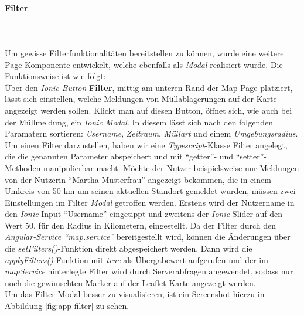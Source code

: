 \documentclass[a4paper, 11pt, DIV=11, listof=numbered, numbers=noenddot]{scrartcl}
\begin{document}
	\paragraph{Filter}
	\textbf{}\\
	\textbf{}\\
	Um gewisse Filterfunktionalitäten bereitstellen zu können, wurde eine weitere Page-Komponente entwickelt, welche ebenfalls als \textit{Modal} realisiert wurde.
	Die Funktionsweise ist wie folgt:\\
	Über den \textit{Ionic Button} \textbf{Filter}, mittig am unteren Rand der Map-Page platziert, lässt sich einstellen, welche Meldungen von Müllablagerungen auf der Karte angezeigt werden sollen. Klickt man auf diesen Button, öffnet sich, wie auch bei der Müllmeldung, ein \textit{Ionic Modal}. In diesem lässt sich nach den folgenden Paramatern sortieren: \textit{Username}, \textit{Zeitraum}, \textit{Müllart} und einem \textit{Umgebungsradius}. Um einen Filter darzustellen, haben wir eine \textit{Typescript}-Klasse Filter angelegt, die die genannten Parameter abspeichert und mit \enquote{getter}- und \enquote{setter}-Methoden manipulierbar macht.
	Möchte der Nutzer beispielsweise nur Meldungen von der Nutzerin “Martha Musterfrau” angezeigt bekommen, die in einem Umkreis von 50 km um seinen aktuellen Standort gemeldet wurden, müssen zwei Einstellungen im Filter \textit{Modal} getroffen werden. Erstens wird der Nutzername in den \textit{Ionic} Input \enquote{Username} eingetippt und zweitens der \textit{Ionic} Slider auf den Wert 50, für den Radius in Kilometern, eingestellt.
	Da der Filter durch den \textit{Angular-Service \enquote{map.service}} bereitgestellt wird, können die Änderungen über die \textit{setFilters()}-Funktion direkt abgespeichert werden. Dann wird die \textit{applyFilters()}-Funktion mit \textit{true} als Übergabewert aufgerufen und der im \textit{mapService} hinterlegte Filter wird durch Serverabfragen angewendet, sodass nur noch die gewünschten Marker auf der Leaflet-Karte angezeigt werden.\\
	Um das Filter-Modal besser zu visualisieren, ist ein Screenshot hierzu in Abbildung \ref{fig:app-filter} zu sehen.
\end{document}
